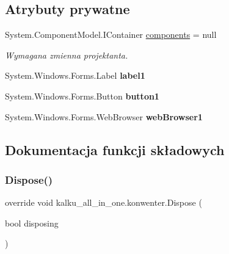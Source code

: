 \subsection*{Atrybuty prywatne}
\begin{DoxyCompactItemize}
\item 
System.\+Component\+Model.\+I\+Container \mbox{\hyperlink{classkalku__all__in__one_1_1konwenter_a406b6efe79f830bd77c75f2fef0dbc5c}{components}} = null
\begin{DoxyCompactList}\small\item\em Wymagana zmienna projektanta. \end{DoxyCompactList}\item 
\mbox{\label{classkalku__all__in__one_1_1konwenter_a1eb936b3abc59fb7c525004741d5712d}} 
System.\+Windows.\+Forms.\+Label {\bfseries label1}
\item 
\mbox{\label{classkalku__all__in__one_1_1konwenter_ac8ed83c16b7d70cf3aa541220b7435dc}} 
System.\+Windows.\+Forms.\+Button {\bfseries button1}
\item 
\mbox{\label{classkalku__all__in__one_1_1konwenter_a42b938e16c6c5bdb724ad874990757db}} 
System.\+Windows.\+Forms.\+Web\+Browser {\bfseries web\+Browser1}
\end{DoxyCompactItemize}


\subsection{Dokumentacja funkcji składowych}
\mbox{\label{classkalku__all__in__one_1_1konwenter_ae40e1dca0a5a109de89d31da42748193}} 
\subsubsection{\texorpdfstring{Dispose()}{Dispose()}}
{\footnotesize\ttfamily override void kalku\+\_\+all\+\_\+in\+\_\+one.\+konwenter.\+Dispose (\begin{DoxyParamCaption}\item[{bool}]{disposing }\end{DoxyParamCaption})\hspace{0.3cm}{\ttfamily [protected]}}



